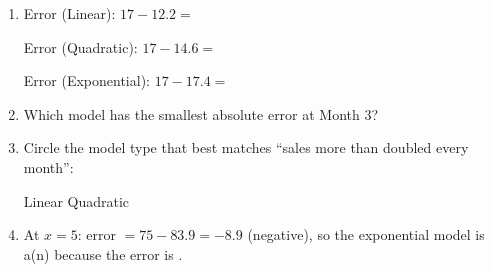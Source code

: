 \documentclass[10pt]{article}
\begin{document}
\begin{tcolorbox}[colback=white, colframe=black!40,
    title=\textbf{Tier R --- Remediate},
    fonttitle=\bfseries, arc=2mm, left=3mm, right=3mm, top=2mm, bottom=2mm]

\begin{enumerate}[itemsep=10pt]
  \item Error (Linear): $17 - 12.2 = $ 

        Error (Quadratic): $17 - 14.6 = $ 

        Error (Exponential): $17 - 17.4 = $ 

  \item Which model has the smallest absolute error at Month 3? 

  \item Circle the model type that best matches ``sales more than doubled every month'':

        \hspace{2cm} Linear \hspace{2cm} Quadratic \hspace{2cm} 

  \item At $x = 5$: error $= 75 - 83.9 = -8.9$ (negative), so the exponential model is a(n)
         because the error is .
\end{enumerate}
\end{tcolorbox}

\vspace{0.1in}
\end{document}
